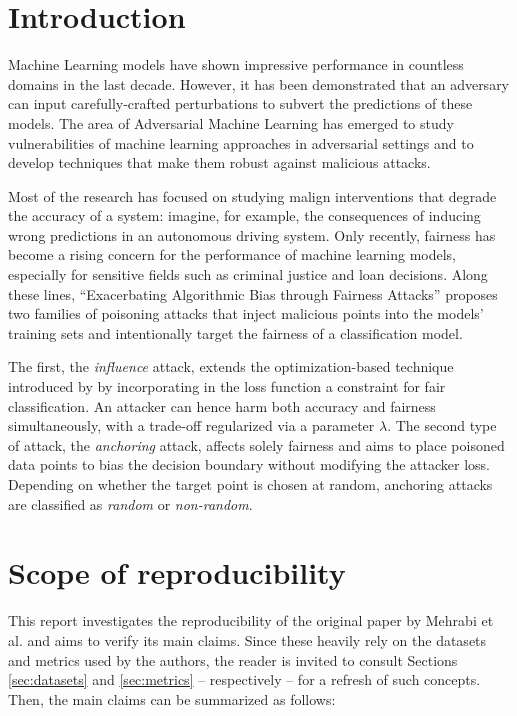 

\section{Introduction}
Machine Learning models have shown impressive performance in countless domains in the last decade. However, it has been demonstrated that an adversary can input carefully-crafted perturbations to subvert the predictions of these models. The area of Adversarial Machine Learning has emerged to study vulnerabilities of machine learning approaches in adversarial settings and to develop techniques that make them robust against malicious attacks.

Most of the research has focused on studying malign interventions that degrade the accuracy of a system: imagine, for example, the consequences of inducing wrong predictions in an autonomous driving system. Only recently, fairness has become a rising concern for the performance of machine learning models, especially for sensitive fields such as criminal justice and loan decisions. Along these lines, “Exacerbating Algorithmic Bias through Fairness Attacks” \citep{originalpaper} proposes two families of poisoning attacks that inject malicious points into the models’ training sets and intentionally target the fairness of a classification model.

The first, the \textit{influence} attack, extends the optimization-based technique introduced by \citet{koh2018} by incorporating in the loss function a constraint for fair classification. An attacker can hence harm both accuracy and fairness simultaneously, with a trade-off regularized via a parameter $\lambda$. The second type of attack, the \textit{anchoring} attack, affects solely fairness and aims to place poisoned data points to bias the decision boundary without modifying the attacker loss. Depending on whether the target point is chosen at random, anchoring attacks are classified as \textit{random} or \textit{non-random}.
\section{Scope of reproducibility}
\label{sec:claims}

This report investigates the reproducibility of the original paper by Mehrabi et al. and aims to verify its main claims. Since these heavily rely on the datasets and metrics used by the authors, the reader is invited to consult Sections \ref{sec:datasets} and \ref{sec:metrics} -- respectively -- for a refresh of such concepts. Then, the main claims can be summarized as follows:

